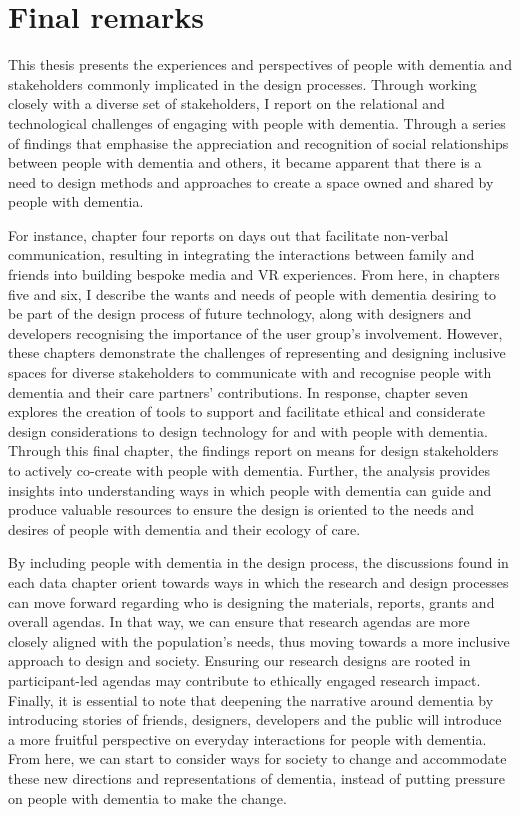\section{Final remarks}
\label{Discussion:FinalRemarks}
This thesis presents the experiences and perspectives of people with dementia and stakeholders commonly implicated in the design processes. Through working closely with a diverse set of stakeholders, I report on the relational and technological challenges of engaging with people with dementia. Through a series of findings that emphasise the appreciation and recognition of social relationships between people with dementia and others, it became apparent that there is a need to design methods and approaches to create a space owned and shared by people with dementia.

For instance, chapter four reports on days out that facilitate non-verbal communication, resulting in integrating the interactions between family and friends into building bespoke media and VR experiences. From here, in chapters five and six, I describe the wants and needs of people with dementia desiring to be part of the design process of future technology, along with designers and developers recognising the importance of the user group's involvement. However, these chapters demonstrate the challenges of representing and designing inclusive spaces for diverse stakeholders to communicate with and recognise people with dementia and their care partners' contributions. In response, chapter seven explores the creation of tools to support and facilitate ethical and considerate design considerations to design technology for and with people with dementia. Through this final chapter, the findings report on means for design stakeholders to actively co-create with people with dementia. Further, the analysis provides insights into understanding ways in which people with dementia can guide and produce valuable resources to ensure the design is oriented to the needs and desires of people with dementia and their ecology of care.

By including people with dementia in the design process, the discussions found in each data chapter orient towards ways in which the research and design processes can move forward regarding who is designing the materials, reports, grants and overall agendas. In that way, we can ensure that research agendas are more closely aligned with the population's needs, thus moving towards a more inclusive approach to design and society. Ensuring our research designs are rooted in participant-led agendas may contribute to ethically engaged research impact. Finally, it is essential to note that deepening the narrative around dementia by introducing stories of friends, designers, developers and the public will introduce a more fruitful perspective on everyday interactions for people with dementia. From here, we can start to consider ways for society to change and accommodate these new directions and representations of dementia, instead of putting pressure on people with dementia to make the change.



